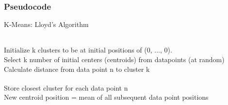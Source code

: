 \documentclass[10pt,twocolumn]{article}
\begin{document}
\subsubsection {Pseudocode}

\begin{algorithm}
  \caption{ K-Means: Lloyd's Algorithm }
  \begin{algorithmic}[1] \\
    Initialize k clusters to be at initial positions of (0, ..., 0).\\
    Select k number of initial centers (centroids) from datapoints (at random)
       \\
        Calculate distance from data point n to cluster k \\
      \EndFor \\
        Store closest cluster for each data point n
     \EndFor \\
        New centroid position = mean of all subsequent data point positions
    \EndWhile
  \end{algorithmic}




\end{algorithm}
\end{document}
